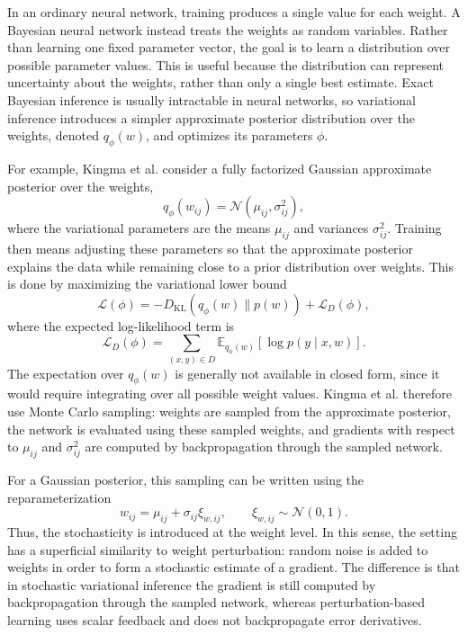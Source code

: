 In an ordinary neural network, training produces a single value for each weight. A Bayesian neural network instead treats the weights as random variables. Rather than learning one fixed parameter vector, the goal is to learn a distribution over possible parameter values. This is useful because the distribution can represent uncertainty about the weights, rather than only a single best estimate. Exact Bayesian inference is usually intractable in neural networks, so variational inference introduces a simpler approximate posterior distribution over the weights, denoted \(q_{\phi}(w)\), and optimizes its parameters \(\phi\).

For example, Kingma et al. consider a fully factorized Gaussian approximate posterior over the weights,
\begin{equation}
q_{\phi}(w_{ij})
=
\mathcal{N}(\mu_{ij}, \sigma_{ij}^{2}),
\end{equation}
where the variational parameters are the means \(\mu_{ij}\) and variances \(\sigma_{ij}^{2}\). Training then means adjusting these parameters so that the approximate posterior explains the data while remaining close to a prior distribution over weights. This is done by maximizing the variational lower bound
\begin{equation}
\mathcal{L}(\phi)
=
-D_{\mathrm{KL}}(q_{\phi}(w) \| p(w))
+
\mathcal{L}_{D}(\phi),
\end{equation}
where the expected log-likelihood term is
\begin{equation}
\mathcal{L}_{D}(\phi)
=
\sum_{(x,y)\in D}
\mathbb{E}_{q_{\phi}(w)}
\left[
\log p(y \mid x,w)
\right].
\end{equation}
The expectation over \(q_{\phi}(w)\) is generally not available in closed form, since it would require integrating over all possible weight values. Kingma et al. therefore use Monte Carlo sampling: weights are sampled from the approximate posterior, the network is evaluated using these sampled weights, and gradients with respect to \(\mu_{ij}\) and \(\sigma_{ij}^{2}\) are computed by backpropagation through the sampled network.

For a Gaussian posterior, this sampling can be written using the reparameterization
\begin{equation}
w_{ij}
=
\mu_{ij}
+
\sigma_{ij}\xi_{w,ij},
\qquad
\xi_{w,ij}
\sim
\mathcal{N}(0,1).
\label{eq:lrt_weight_reparameterization}
\end{equation}
Thus, the stochasticity is introduced at the weight level. In this sense, the setting has a superficial similarity to weight perturbation: random noise is added to weights in order to form a stochastic estimate of a gradient. The difference is that in stochastic variational inference the gradient is still computed by backpropagation through the sampled network, whereas perturbation-based learning uses scalar feedback and does not backpropagate error derivatives.

